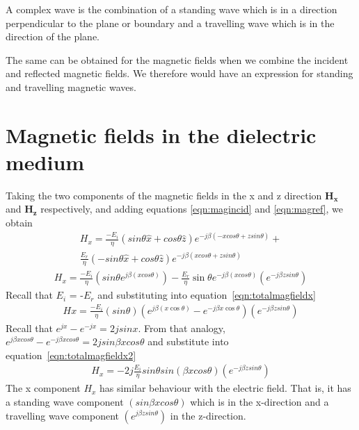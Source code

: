 A complex wave is the combination of a standing wave which is in a direction perpendicular to the plane or boundary and a travelling wave which is in the direction of the plane.

The same can be obtained for the magnetic fields when we combine the incident and reflected magnetic fields. We therefore
would have an expression for standing and travelling magnetic waves.

\section{Magnetic fields in the dielectric medium}
Taking the two components of the magnetic fields in the x and z direction
$\boldsymbol{H_x}$ and $\boldsymbol{H_z}$ respectively, and adding equations \ref{eqn:magincid} and \ref{eqn:magref}, we obtain
\begin{align*}
H_x = \frac{-E_i}{\eta} (sin\theta \hat{x} + cos\theta \hat{z}) e^{-j\beta( -xcos\theta + zsin\theta)} +\\ 
\frac{E_r}{\eta} \left(-sin\theta \hat{x} + cos\theta \hat{z}\right) e^{-j\beta( xcos\theta + zsin\theta)}
\end{align*}
\begin{align}
H_x = \frac{-E_i}{\eta}(sin\theta e^{j\beta( xcos\theta)} ) - \frac{E_r}{\eta}\sin\theta e^{-j\beta( xcos\theta)} (e^{-j\beta zsin\theta})
\label{eqn:totalmagfieldx}
\end{align}
Recall that $E_i$ = -$E_r$ and substituting into equation~\ref{eqn:totalmagfieldx}
\begin{align}
Hx = \frac{-E_i}{\eta}(sin\theta)( e^{j\beta( x\cos\theta)} - e^{-j\beta x\cos\theta}) (e^{-j\beta zsin\theta})
\label{eqn:totalmagfieldx2}
\end{align}
Recall that $e^{jx} - e^{-jx} = 2jsinx$. From that analogy, $e^{j\beta xcos\theta} - e^{-j\beta xcos\theta} = 2jsin\beta xcos\theta$ and substitute into
equation~\eqref{eqn:totalmagfieldx2}
\begin{align}
H_x =  -2j \frac{E_i}{\eta}sin\theta sin(\beta xcos\theta)(e^{-j\beta zsin\theta})
\label{eqn:totalmagfieldx3}
\end{align} 
The x component $H_x$ has similar behaviour with the electric field. That is, it has a standing wave component $(sin\beta xcos\theta)$ which is in the x-direction and a travelling wave component $(e^{j\beta zsin\theta})$ in the z-direction.

